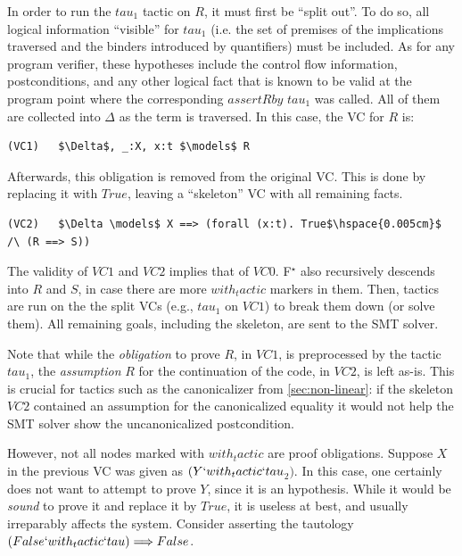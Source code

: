 \documentclass[runningheads]{llncs}
\newcommand\fstar{F$^\star$\xspace}
\newcommand\metafstar{Meta-F$^\star$\xspace}
\newcommand{\comm}[3]{\ifcheckpagebudget\else\ifdraft{{\color{#1}[#2: #3]}}\fi\fi}
\newcommand{\guido}[1]{\comm{blue}{Guido}{#1}}
\newcommand{\cpc}[1]{\comm{brown}{Cl\'ement}{#1}}
\begin{document}
%
In order to run the \ls$tau$$_{\!1}$ tactic on \ls$R$, it must first be ``split
out''.
%
To do so, all logical information ``visible'' for \ls$tau$$_{\!1}$
(i.e. the set of premises of the implications traversed and
the binders introduced by quantifiers) must be included.
%
%
As for any program verifier, these hypotheses include the control flow
information, postconditions, and any other logical fact that is known to
be valid at the program point where the corresponding \ls$assert R by$\!
\ls$tau$$_{\!1}$ was called.
%
All of them are collected into $\Delta$ as the term is traversed.
%
In this case, the VC for $R$ is:
\begin{lstlisting}
(VC1)   $\Delta$, _:X, x:t $\models$ R
\end{lstlisting}
%
%
Afterwards, this obligation is removed from the original VC. This is done
by replacing it with \ls$True$, leaving a ``skeleton'' VC with all
remaining facts.
%
\begin{lstlisting}
(VC2)   $\Delta \models$ X ==> (forall (x:t). True$\hspace{0.005cm}$ /\ (R ==> S))
\end{lstlisting}
%
The validity of \ls$VC1$ and \ls$VC2$ implies that of \ls$VC0$.
%
\fstar also recursively descends into \ls$R$ and \ls$S$, in case there are more
\ls$with_tactic$ markers in them.
%
Then, tactics are run on the the split VCs (e.g.,
\ls$tau$$_{\!1}$ on \ls$VC1$) to break them down (or solve them).
All remaining goals, including the skeleton, are sent to the SMT solver.

Note that while the \emph{obligation} to prove \ls$R$, in \ls$VC1$, is
preprocessed by the tactic \ls$tau$$_{\!1}$, the \emph{assumption} \ls$R$ for the
continuation of the code, in \ls$VC2$, is left as-is.
%
This is crucial for tactics such as the canonicalizer from
\autoref{sec:non-linear}: if the skeleton \ls$VC2$
contained an assumption for the canonicalized equality
it would not help the SMT solver show the uncanonicalized postcondition.

However, not all nodes marked with \ls$with_tactic$
are proof obligations.
%
Suppose \ls$X$ in the previous VC was given as \ls$(Y `with_tactic` tau$$_{\!2}$\ls$)$.
%
In this case, one certainly does not want to attempt to prove
\ls$Y$, since it is an hypothesis.
%
While it would be \emph{sound} to prove it and replace
it by \ls$True$, it is useless at best,
and usually irreparably affects the system. Consider asserting the tautology
\ls$(False `with_tactic` tau) ==> False$.
\end{document}
